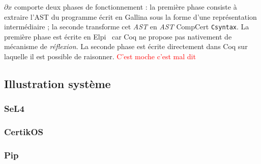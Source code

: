 		$\partial x$ comporte deux phases de fonctionnement : la première phase consiste à extraire l'AST du programme écrit en Gallina sous la forme d'une représentation intermédiaire ; la seconde transforme cet \emph{AST} en \emph{AST} CompCert \texttt{Csyntax}. La première phase est écrite en Elpi~\cite{elpi} car Coq ne propose pas nativement de mécanisme de \emph{réflexion}. La seconde phase est écrite directement dans Coq sur laquelle il est possible de raisonner. \textcolor{red}{C'est moche c'est mal dit}

		\subsection{Illustration système}

			\subsubsection{SeL4}
			\subsubsection{CertikOS}
			\subsubsection{Pip}
